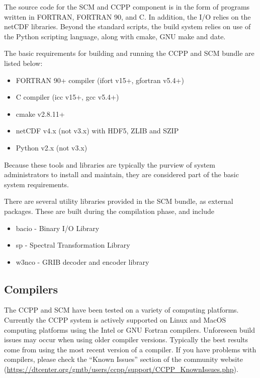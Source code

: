 The source code for the SCM and CCPP component is in the form of programs written in FORTRAN, FORTRAN 90, and C. In addition, the I/O relies on the netCDF libraries. Beyond the standard scripts, the build system relies on use of the Python scripting language, along with cmake, GNU make and date.

The basic requirements for building and running the CCPP and SCM bundle are listed below:
\begin{itemize}
    \item FORTRAN 90+ compiler (ifort v15+, gfortran v5.4+)
    \item C compiler (icc v15+, gcc v5.4+)
    \item cmake v2.8.11+
    \item netCDF v4.x (not v3.x) with HDF5, ZLIB and SZIP
    \item Python v2.x (not v3.x)
\end{itemize}

Because these tools and libraries are typically the purview of system administrators to install and maintain, they are considered  part of the basic system requirements.

There are several utility libraries provided in the SCM bundle, as external packages. These are built during the compilation phase, and include
\begin{itemize}
    \item bacio - Binary I/O Library
    \item sp - Spectral Transformation Library
    \item w3nco - GRIB decoder and encoder library
\end{itemize}

\subsection{Compilers}
The CCPP and SCM have been tested on a variety of
computing platforms. Currently the CCPP system is actively supported
on Linux and MacOS computing platforms using the Intel or GNU Fortran
compilers. Unforeseen build issues may occur when using older
compiler versions. Typically the best results come from using the
most recent version of a compiler. If you have problems with compilers, please check the ``Known Issues'' section of the
community website (\url{https://dtcenter.org/gmtb/users/ccpp/support/CCPP_KnownIssues.php}).

